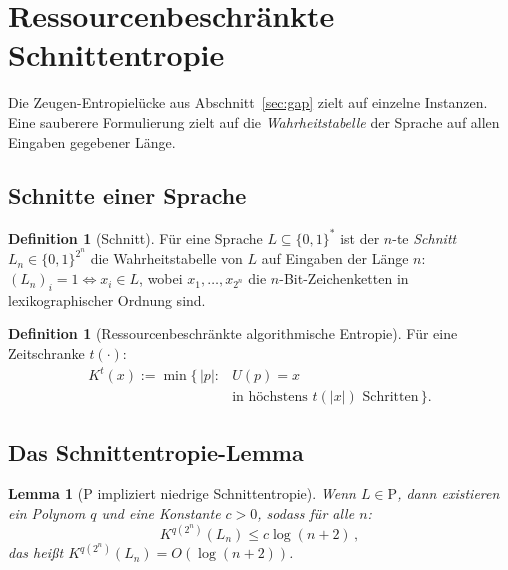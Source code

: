 \documentclass[aps,prd,twocolumn,superscriptaddress,nofootinbib]{revtex4-2}
\newtheorem{lemma}[theorem]{Lemma}
\theoremstyle{definition}
\newtheorem{definition}[theorem]{Definition}
\theoremstyle{remark}
\newcommand{\PP}{\mathrm{P}}
\begin{document}
\section{Ressourcenbeschränkte Schnittentropie}
\label{sec:slices}

Die Zeugen-Entropielücke aus Abschnitt~\ref{sec:gap} zielt auf einzelne Instanzen. Eine sauberere Formulierung zielt auf die \textit{Wahrheitstabelle} der Sprache auf allen Eingaben gegebener Länge.

\subsection{Schnitte einer Sprache}

\begin{definition}[Schnitt]
Für eine Sprache $L \subseteq \{0,1\}^*$ ist der $n$-te \textit{Schnitt} $L_n \in \{0,1\}^{2^n}$ die Wahrheitstabelle von $L$ auf Eingaben der Länge $n$: $(L_n)_i = 1 \iff x_i \in L$, wobei $x_1, \ldots, x_{2^n}$ die $n$-Bit-Zeichenketten in lexikographischer Ordnung sind.
\end{definition}

\begin{definition}[Ressourcenbeschränkte algorithmische Entropie]
Für eine Zeitschranke $t(\cdot)$:
\begin{equation}
\begin{aligned}
K^t(x) := \min\{\, |p| :{}& U(p) = x\\
&\text{in höchstens } t(|x|)\text{ Schritten}\,\}.
\end{aligned}
\label{eq:Kt}
\end{equation}
\end{definition}

\subsection{Das Schnittentropie-Lemma}

\begin{lemma}[P impliziert niedrige Schnittentropie]
\label{lem:p_low_entropy}
Wenn $L \in \PP$, dann existieren ein Polynom $q$ und eine Konstante $c > 0$, sodass für alle $n$:
\begin{equation}
K^{q(2^n)}(L_n) \leq c \log(n+2)\,,
\label{eq:p_entropy}
\end{equation}
das heißt $K^{q(2^n)}(L_n) = O(\log(n+2))$.
\end{lemma}
\end{document}
